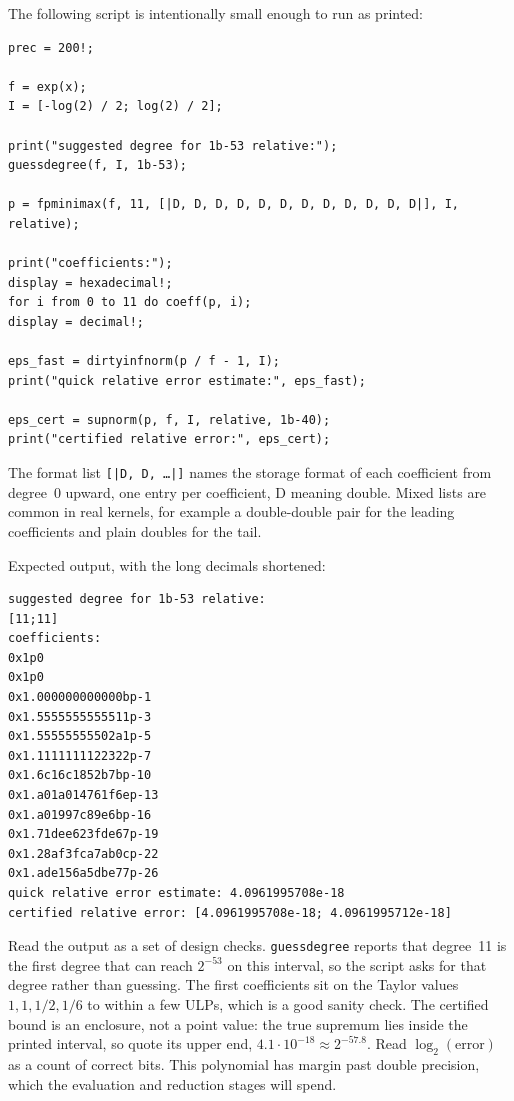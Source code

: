 \documentclass[manuscript, nonacm]{acmart}
\begin{document}
  The following script is intentionally small enough to run as printed:
  \begin{lstlisting}[style=sollya]
prec = 200!;

f = exp(x);
I = [-log(2) / 2; log(2) / 2];

print("suggested degree for 1b-53 relative:");
guessdegree(f, I, 1b-53);

p = fpminimax(f, 11, [|D, D, D, D, D, D, D, D, D, D, D, D|], I, relative);

print("coefficients:");
display = hexadecimal!;
for i from 0 to 11 do coeff(p, i);
display = decimal!;

eps_fast = dirtyinfnorm(p / f - 1, I);
print("quick relative error estimate:", eps_fast);

eps_cert = supnorm(p, f, I, relative, 1b-40);
print("certified relative error:", eps_cert);
  \end{lstlisting}

  The format list \texttt{[|D, D, \ldots|]} names the storage format of
  each coefficient from degree~0 upward, one entry per coefficient, D
  meaning double. Mixed lists are common in real kernels, for example a
  double-double pair for the leading coefficients and plain doubles for
  the tail.

  Expected output, with the long decimals shortened:

  \begin{lstlisting}[style=output]
suggested degree for 1b-53 relative:
[11;11]
coefficients:
0x1p0
0x1p0
0x1.000000000000bp-1
0x1.5555555555511p-3
0x1.55555555502a1p-5
0x1.1111111122322p-7
0x1.6c16c1852b7bp-10
0x1.a01a014761f6ep-13
0x1.a01997c89e6bp-16
0x1.71dee623fde67p-19
0x1.28af3fca7ab0cp-22
0x1.ade156a5dbe77p-26
quick relative error estimate: 4.0961995708e-18
certified relative error: [4.0961995708e-18; 4.0961995712e-18]
  \end{lstlisting}

  Read the output as a set of design checks.  \texttt{guessdegree} reports
  that degree~11 is the first degree that can reach $2^{-53}$ on this interval,
  so the script asks for that degree rather than guessing. The first coefficients
  sit on the Taylor values $1, 1, 1/2, 1/6$ to within a few ULPs, which is
  a good sanity check. The certified bound is an enclosure, not a point
  value: the true supremum lies inside the printed interval, so quote its
  upper end, $4.1 \cdot 10^{-18} \approx 2^{-57.8}$. Read
  $\log_2(\text{error})$ as a count of correct bits. This polynomial has
  margin past double precision, which the evaluation and reduction stages
  will spend.
\end{document}
